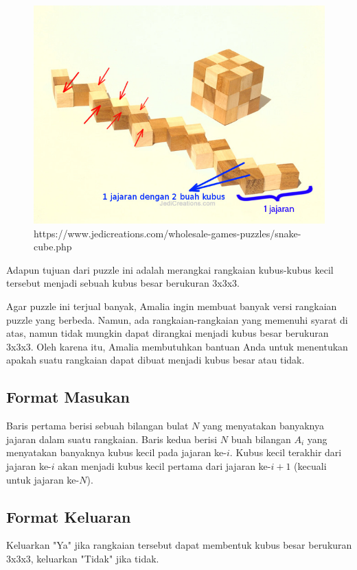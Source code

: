 \documentclass{article}
\begin{document}
\begin{itemize}
  \begin{figure}[h!]
    \centering
    \includegraphics[width=0.4\linewidth]{contoh-1.jpg}
    \caption{https://www.jedicreations.com/wholesale-games-puzzles/snake-cube.php}
  \end{figure}

\end{itemize}

\par\noindent Adapun tujuan dari puzzle ini adalah merangkai rangkaian kubus-kubus kecil tersebut menjadi sebuah kubus besar berukuran 3x3x3.

\par\noindent Agar puzzle ini terjual banyak, Amalia ingin membuat banyak versi rangkaian puzzle yang berbeda. Namun, ada rangkaian-rangkaian yang memenuhi syarat di atas, namun tidak mungkin dapat dirangkai menjadi kubus besar berukuran 3x3x3. Oleh karena itu, Amalia membutuhkan bantuan Anda untuk menentukan apakah suatu rangkaian dapat dibuat menjadi kubus besar atau tidak.

\subsection*{Format Masukan}

\par\noindent Baris pertama berisi sebuah bilangan bulat $N$ yang menyatakan banyaknya jajaran dalam suatu rangkaian. Baris kedua berisi $N$ buah bilangan $A_i$ yang menyatakan banyaknya kubus kecil pada jajaran ke-$i$. Kubus kecil terakhir dari jajaran ke-$i$ akan menjadi kubus kecil pertama dari jajaran ke-$i+1$ (kecuali untuk jajaran ke-$N$).

\subsection*{Format Keluaran}

\par\noindent Keluarkan "Ya" jika rangkaian tersebut dapat membentuk kubus besar berukuran 3x3x3, keluarkan "Tidak" jika tidak.
\end{document}
